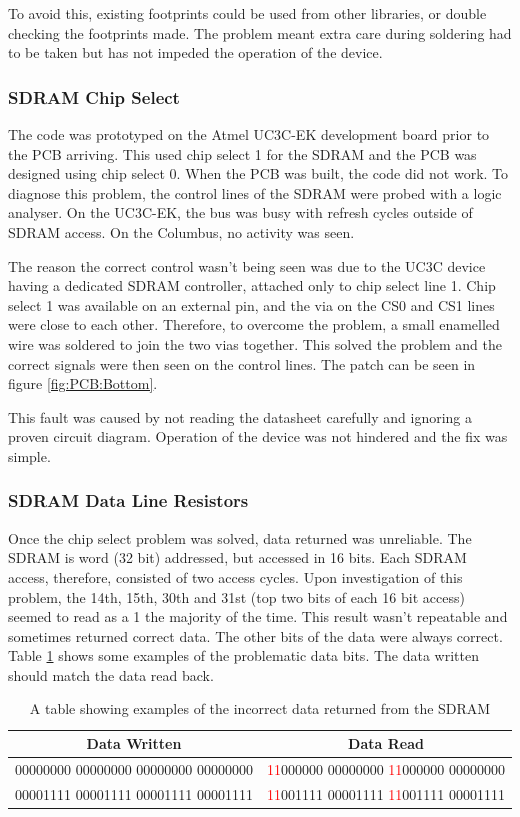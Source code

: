 To avoid this, existing footprints could be used from other libraries, or double checking the footprints made. The problem meant extra care during soldering had to be taken but has not impeded the operation of the device. 

\subsubsection{SDRAM Chip Select}
The code was prototyped on the Atmel UC3C-EK development board prior to the PCB arriving. This used chip select 1 for the SDRAM and the PCB was designed using chip select 0. When the PCB was built, the code did not work. To diagnose this problem, the control lines of the SDRAM were probed with a logic analyser. On the UC3C-EK, the bus was busy with refresh cycles outside of SDRAM access. On the Columbus, no activity was seen. 

The reason the correct control wasn't being seen was due to the UC3C device having a dedicated SDRAM controller, attached only to chip select line 1. Chip select 1 was available on an external pin, and the via on the CS0 and CS1 lines were close to each other. Therefore, to overcome the problem, a small enamelled wire was soldered to join the two vias together. This solved the problem and the correct signals were then seen on the control lines. The patch can be seen in figure \ref{fig:PCB:Bottom}. 

This fault was caused by not reading the datasheet carefully and ignoring a proven circuit diagram. Operation of the device was not hindered and the fix was simple.

\subsubsection{SDRAM Data Line Resistors}
Once the chip select problem was solved, data returned was unreliable. The SDRAM is word (32 bit) addressed, but accessed in 16 bits. Each SDRAM access, therefore, consisted of two access cycles. 
Upon investigation of this problem, the 14th, 15th, 30th and 31st (top two bits of each 16 bit access) seemed to read as a 1 the majority of the time. This result wasn't repeatable and sometimes returned correct data. The other bits of the data were always correct. Table \ref{table:SDRAM_Err} shows some examples of the problematic data bits. The data written should match the data read back. 

\begin{table}[!ht]
\caption{A table showing examples of the incorrect data returned from the SDRAM}
\label{table:SDRAM_Err}
\begin{tabular}{|c|c|}\hline
Data Written							&	Data Read \\\hline
00000000 00000000 00000000 00000000		&	\textcolor{red}{11}000000 00000000 \textcolor{red}{11}000000 00000000 \\
00001111 00001111 00001111 00001111		&	\textcolor{red}{11}001111 00001111 \textcolor{red}{11}001111 00001111 \\\hline
\end{tabular}
\end{table}

